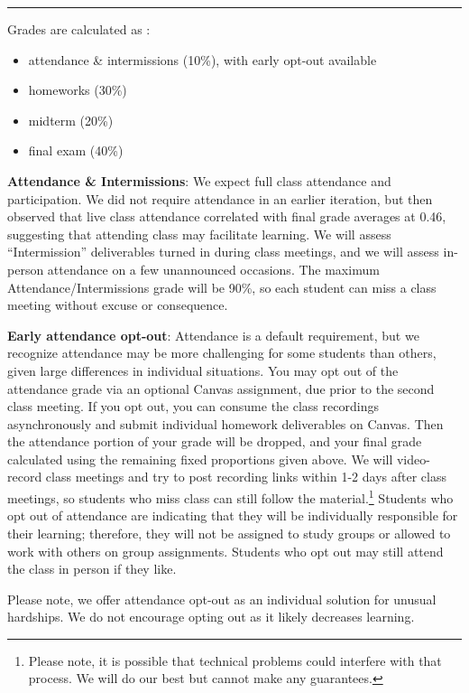 \documentclass[12pt]{article}
\begin{document}
\medskip
\hrule
\medskip

Grades are calculated as :

\begin{itemize}[noitemsep]
    \item attendance \& intermissions (10\%), with early opt-out available
    \item homeworks (30\%)
    \item midterm (20\%)
    \item final exam (40\%)
\end{itemize}
\medskip
\textbf{Attendance \& Intermissions}: We expect full class attendance and participation. We did not require attendance in an earlier iteration, but then observed that live class attendance correlated with final grade averages at 0.46, suggesting that attending class may facilitate learning. We will assess ``Intermission'' deliverables turned in during class meetings, and we will assess in-person attendance on a few unannounced occasions. The maximum Attendance/Intermissions grade will be 90\%, so each student can miss a class meeting without excuse or consequence.

\textbf{Early attendance opt-out}: Attendance is a default requirement, but we recognize attendance may be more challenging for some students than others, given large differences in individual situations. You may opt out of the attendance grade via an optional Canvas assignment, due prior to the second class meeting. If you opt out, you can consume the class recordings asynchronously and submit individual homework deliverables on Canvas. Then the attendance portion of your grade will be dropped, and your final grade calculated using the remaining fixed proportions given above. We will video-record class meetings and try to post recording links within 1-2 days after class meetings, so students who miss class can still follow the material.\footnote{Please note, it is possible that technical problems could interfere with that process. We will do our best but cannot make any guarantees.} Students who opt out of attendance are indicating that they will be individually responsible for their learning; therefore, they will not be assigned to study groups or allowed to work with others on group assignments. Students who opt out may still attend the class in person if they like. 

Please note, we offer attendance opt-out as an individual solution for unusual hardships. We do not encourage opting out as it likely decreases learning. 
\end{document}
